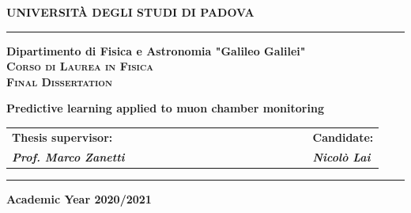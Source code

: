 \begin{titlepage}
    \begin{center}
        {{\huge{\textsc{\bf UNIVERSITÀ DEGLI STUDI DI PADOVA}}}\\}
        \vspace{5mm}
        \hrule
        \vspace{5mm}
        {\Large{\bf Dipartimento di Fisica e Astronomia "Galileo Galilei"}} \\
        \vspace{5mm}
        {\Large{\textsc{\bf Corso di Laurea in Fisica}}}\\
        \vspace{20mm}
        {\Large{\textsc{\bf Final Dissertation}}}\\
        \vspace{20mm}
        \begin{spacing}{2}
            {\LARGE \textbf{Predictive learning applied to muon chamber monitoring}}\\
        \end{spacing}
        \vspace{8mm}
    \end{center}


    \vspace{10mm}


    \begin{spacing}{2}
        \begin{tabular}{ l  c  c c c  cccccccc c c c  c  l }
            {\Large{\bf Thesis supervisor:}} &&&&&&&&&&&&&&&&& {\Large{\bf Candidate:}}\\
            {\Large{\bf \textit{Prof. Marco Zanetti}}} &&&&&&&&&&&&&&&&& {\Large{\bf \textit{Nicolò Lai}}}\\
        \end{tabular}
    \end{spacing}


    \vspace{15 mm}
    \vspace*{\fill}
    \hrule


    \begin{center}
        {\Large{\bf Academic Year 2020/2021}}
    \end{center}


\end{titlepage}